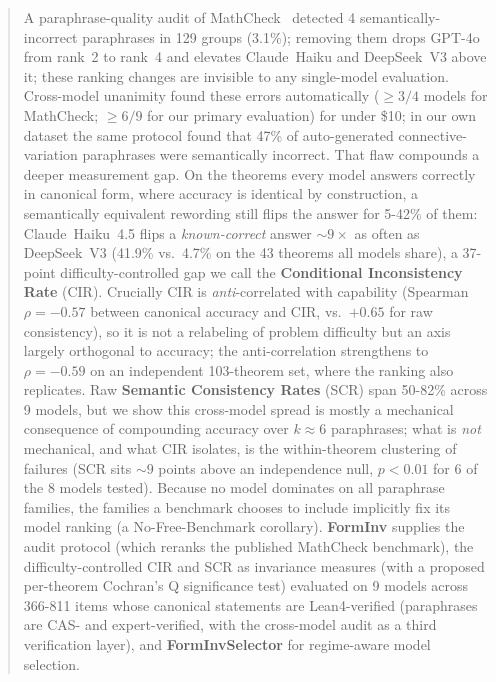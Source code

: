 \documentclass{article}
\begin{document}
\begin{abstract}
A paraphrase-quality audit of MathCheck~\citep{zhou2024mathcheck} detected 4 semantically-incorrect paraphrases in 129 groups (3.1\%); removing them drops GPT-4o from rank~2 to rank~4 and elevates Claude~Haiku and DeepSeek~V3 above it; these ranking changes are invisible to any single-model evaluation.
Cross-model unanimity found these errors automatically ($\geq 3/4$ models for MathCheck; $\geq 6/9$ for our primary evaluation) for under \$10; in our own dataset the same protocol found that 47\% of auto-generated connective-variation paraphrases were semantically incorrect.
That flaw compounds a deeper measurement gap. On the theorems every model answers correctly in canonical form, where accuracy is identical by construction, a semantically equivalent rewording still flips the answer for 5-42\% of them: Claude~Haiku~4.5 flips a \emph{known-correct} answer ${\sim}9\times$ as often as DeepSeek~V3 (41.9\% vs.\ 4.7\% on the 43 theorems all models share), a 37-point difficulty-controlled gap we call the \textbf{Conditional Inconsistency Rate} (CIR). Crucially CIR is \emph{anti}-correlated with capability (Spearman $\rho=-0.57$ between canonical accuracy and CIR, vs.\ $+0.65$ for raw consistency), so it is not a relabeling of problem difficulty but an axis largely orthogonal to accuracy; the anti-correlation strengthens to $\rho=-0.59$ on an independent 103-theorem set, where the ranking also replicates. Raw \textbf{Semantic Consistency Rates} (SCR) span 50-82\% across 9 models, but we show this cross-model spread is mostly a mechanical consequence of compounding accuracy over $k\approx6$ paraphrases; what is \emph{not} mechanical, and what CIR isolates, is the within-theorem clustering of failures (SCR sits ${\sim}9$ points above an independence null, $p<0.01$ for 6 of the 8 models tested).
Because no model dominates on all paraphrase families, the families a benchmark chooses to include implicitly fix its model ranking (a No-Free-Benchmark corollary).
\textbf{FormInv} supplies the audit protocol (which reranks the published MathCheck benchmark), the difficulty-controlled CIR and SCR as invariance measures (with a proposed per-theorem Cochran's Q significance test) evaluated on 9 models across 366-811 items whose canonical statements are Lean4-verified (paraphrases are CAS- and expert-verified, with the cross-model audit as a third verification layer), and \textbf{FormInvSelector} for regime-aware model selection.
\end{abstract}
\end{document}
